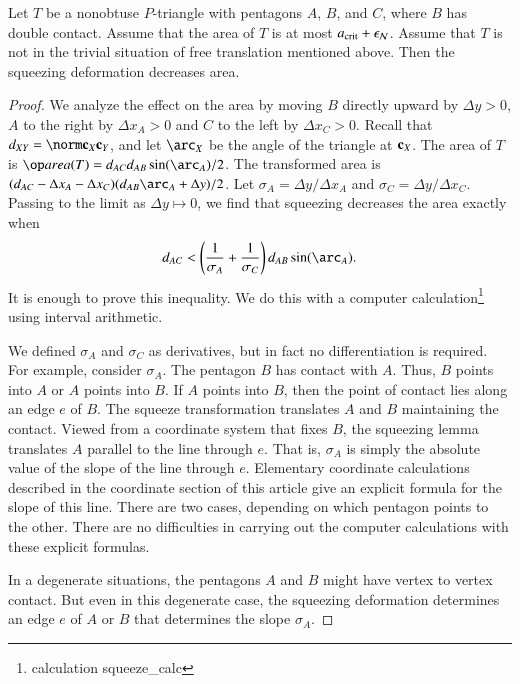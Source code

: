 \begin{lemma}  
  Let $T$ be a nonobtuse $P$-triangle with pentagons $A$, $B$, and
  $C$, where $B$ has double contact.  Assume that the area of $T$ is
  at most $a_\text{crit}+\epsilon_{\mathcal N}$.  Assume that $T$ is not in the trivial
  situation of free translation mentioned above.  Then the squeezing
  deformation decreases area.
\end{lemma}

\begin{proof}  
  We analyze the effect on the area by moving $B$ directly upward by
  $\Delta y >0$, $A$ to the right by $\Delta x_A >0$ and $C$ to the
  left by $\Delta x_C >0$.  Recall that $\dx{XY} = \dd{X}{Y}$, and let
  $\arc_X$ be the angle of the triangle at ${\mathbf c}_X$.  The area of $T$ is
  $\area(T) = d_{AC} d_{AB} \sin(\arc_A)/2$.  The transformed area is
  $(d_{AC}-\Delta x_A - \Delta x_C)(d_{AB}\arc_A + \Delta y)/2$.
   Let $\sigma_A = \Delta y/\Delta x_A$ and $\sigma_C = \Delta y
  /\Delta x_C$.  Passing to the limit as $\Delta y \mapsto 0$, we find
  that squeezing decreases the area exactly when
\[
d_{AC} < \left(\frac{1}{\sigma_A}
+\frac{1}{\sigma_C}\right)d_{AB}\sin(\arc_A).
\]
It is enough to prove this inequality.  We do this with a computer
calculation\footnote{calculation squeeze\_calc} using interval
arithmetic.

We defined $\sigma_A$ and $\sigma_C$ as derivatives, but in fact no
differentiation is required.  For example, consider $\sigma_A$.  The
pentagon $B$ has contact with $A$.  Thus, $B$ points into $A$ or $A$
points into $B$.  If $A$ points into $B$, then the point of contact
lies along an edge $e$ of $B$.  The squeeze transformation translates
$A$ and $B$ maintaining the contact.  Viewed from a coordinate system
that fixes $B$, the squeezing lemma translates $A$ parallel to the
line through $e$.  That is, $\sigma_A$ is simply the absolute value of
the slope of the line through $e$.  Elementary coordinate calculations
described in the coordinate section of this article give an explicit
formula for the slope of this line.  There are two cases, depending on
which pentagon points to the other.  There are no difficulties in
carrying out the computer calculations with these explicit formulas.

In a degenerate situations, the pentagons $A$ and $B$ might have
vertex to vertex contact. But even in this degenerate case, the
squeezing deformation determines an edge $e$ of $A$ or $B$ that
determines the slope $\sigma_A$.
\end{proof}

